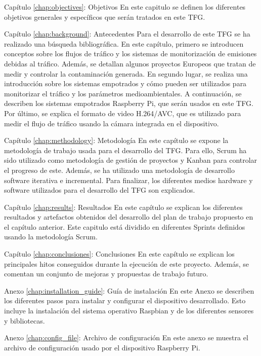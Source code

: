 \begin{definitionlist}
	\item[Capítulo \ref{chap:objectives}: Objetivos] En este capitulo se definen los diferentes objetivos generales y específicos que serán tratados en este \ac{TFG}.
	
	\item[Capítulo \ref{chap:background}: Antecedentes] Para el desarrollo de este \ac{TFG} se ha realizado una búsqueda bibliográfica. En este capítulo, primero se introducen conceptos sobre los flujos de tráfico y los sistemas de monitorización de emisiones debidas al tráfico. Además, se detallan algunos proyectos Europeos que tratan de medir y controlar la contaminación generada. En segundo lugar, se realiza una introducción sobre los sistemas empotrados y cómo pueden ser utilizados para monitorizar el tráfico y los parámetros medioambientales. A continuación, se describen los sistemas empotrados Raspberry Pi, que serán usados en este \ac{TFG}. Por último, se explica el formato de video H.264/AVC, que es utilizado para medir el flujo de tráfico usando la cámara integrada en el dispositivo.
	
	\item[Capítulo \ref{chap:methodology}: Metodología] En este capítulo se expone la metodología de trabajo usada para el desarrollo del \ac{TFG}. Para ello, Scrum ha sido utilizado como metodología de gestión de proyectos y Kanban para controlar el progreso de este. Además, se ha utilizado una metodología de desarrollo software iterativa e incremental. Para finalizar, los diferentes medios hardware y software utilizados para el desarrollo del \ac{TFG} son explicados. 
	
	\item[Capítulo \ref{chap:results}: Resultados] En este capítulo se explican los diferentes resultados y artefactos obtenidos del desarrollo del plan de trabajo propuesto en el capítulo anterior. Este capitulo está dividido en diferentes Sprints definidos usando la metodología Scrum.
	
	\item[Capítulo \ref{chap:conclusiones}: Conclusiones] En este capítulo se explican los principales hitos conseguidos durante la ejecución de este proyecto. Además, se comentan un conjunto de mejoras y propuestas de trabajo futuro.
	
	\item[Anexo \ref{chap:installation_guide}: Guía de instalación] En este Anexo se describen los diferentes pasos para instalar y configurar el dispositivo desarrollado. Esto incluye la instalación del sistema operativo Raspbian y de los diferentes sensores y bibliotecas.
	
	\item[Anexo \ref{chap:config_file}: Archivo de configuración] En este anexo se muestra el archivo de configuración usado por el dispositivo Raspberry Pi.
	
\end{definitionlist}
